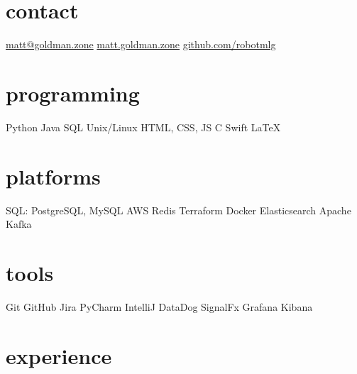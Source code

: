 \documentclass[]{friggeri-mlg-cv} %
\begin{document}


\begin{aside} %
\section{contact}
\href{mailto:matt@goldman.zone}{matt@goldman.zone}
\href{https://matt.goldman.zone}{matt.goldman.zone}
\href{https://github.com/robotmlg}{github.com/robotmlg}
\section{programming}
Python
Java
SQL
Unix/Linux
HTML, CSS, JS
C
Swift
\LaTeX
\section{platforms}
SQL: PostgreSQL, MySQL
AWS
Redis
Terraform
Docker
Elasticsearch
Apache Kafka
\section{tools}
Git
GitHub
Jira
PyCharm
IntelliJ
DataDog
SignalFx
Grafana
Kibana
\end{aside}



\section{experience}
\end{document}

